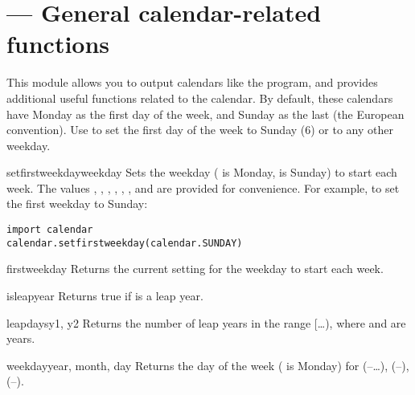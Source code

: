 \section{ ---
         General calendar-related functions}


This module allows you to output calendars like the \UNIX{}
 program, and provides additional useful functions
related to the calendar. By default, these calendars have Monday as
the first day of the week, and Sunday as the last (the European
convention). Use  to set the first day of the
week to Sunday (6) or to any other weekday.

\begin{funcdesc}{setfirstweekday}{weekday}
Sets the weekday ( is Monday,  is Sunday) to start
each week. The values , ,
, , ,
, and  are provided for
convenience. For example, to set the first weekday to Sunday:

\begin{verbatim}
import calendar
calendar.setfirstweekday(calendar.SUNDAY)
\end{verbatim}
\end{funcdesc}

\begin{funcdesc}{firstweekday}{}
Returns the current setting for the weekday to start each week.
\end{funcdesc}

\begin{funcdesc}{isleap}{year}
Returns true if  is a leap year.
\end{funcdesc}

\begin{funcdesc}{leapdays}{y1, y2}
Returns the number of leap years in the range
[\ldots{}), where  and  are years.
\end{funcdesc}

\begin{funcdesc}{weekday}{year, month, day}
Returns the day of the week ( is Monday) for 
(--\ldots),  (--), 
(--).
\end{funcdesc}

